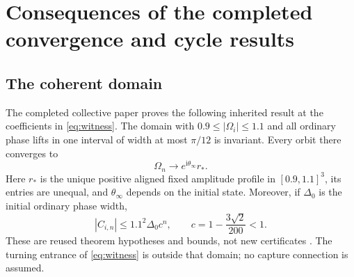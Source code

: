 \documentclass[11pt,a4paper]{article}
\numberwithin{equation}{section}
\theoremstyle{definition}
\theoremstyle{remark}
\newcommand{\iu}{\mathrm i}
\begin{document}
\section{Consequences of the completed convergence and cycle results}
\label{sec:consequences}

\subsection{The coherent domain}
The completed collective paper proves the following inherited result at
the coefficients in \eqref{eq:witness}. The domain with
$0.9\le|\Omega_i|\le1.1$ and all ordinary phase lifts in one interval of
width at most $\pi/12$ is invariant. Every orbit there converges to
\begin{equation}\label{eq:inheritedlimit}
\Omega_n\longrightarrow e^{\iu\theta_\infty}r_*.
\end{equation}
Here $r_*$ is the unique positive aligned fixed amplitude profile in
$[0.9,1.1]^3$, its entries are unequal, and $\theta_\infty$ depends on the
initial state. Moreover, if $\Delta_0$ is the initial ordinary phase width,
\begin{equation}\label{eq:Cbound}
|C_{i,n}|\le1.1^2\Delta_0 c^n,
\qquad c=1-\frac{3\sqrt2}{200}<1.
\end{equation}
These are reused theorem hypotheses and bounds, not new certificates
\cite{Collective}. The turning entrance of \eqref{eq:witness} is outside
that domain; no capture connection is assumed.
\end{document}

